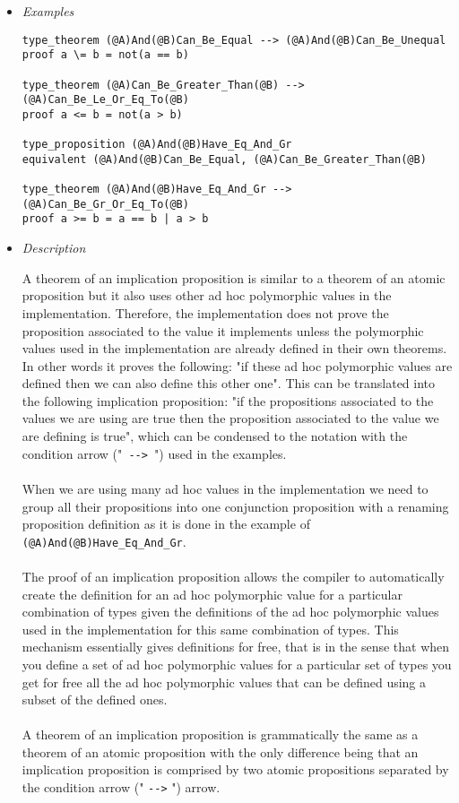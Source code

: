 \documentclass[diploma]{softlab-thesis}
\begin{document}
\begin{itemize}
\item \textit{Examples}

\begin{verbatim}
type_theorem (@A)And(@B)Can_Be_Equal --> (@A)And(@B)Can_Be_Unequal
proof a \= b = not(a == b)

type_theorem (@A)Can_Be_Greater_Than(@B) --> (@A)Can_Be_Le_Or_Eq_To(@B)
proof a <= b = not(a > b)

type_proposition (@A)And(@B)Have_Eq_And_Gr
equivalent (@A)And(@B)Can_Be_Equal, (@A)Can_Be_Greater_Than(@B)

type_theorem (@A)And(@B)Have_Eq_And_Gr --> (@A)Can_Be_Gr_Or_Eq_To(@B)
proof a >= b = a == b | a > b
\end{verbatim}

\item \textit{Description}

A theorem of an implication proposition is similar to a theorem of an atomic
proposition but it also uses other ad hoc polymorphic values in the
implementation. Therefore, the implementation does not prove the proposition
associated to the value it implements unless the polymorphic values used in the
implementation are already defined in their own theorems. In other words it
proves the following: "if these ad hoc polymorphic values are defined then we
can also define this other one". This can be translated into the following
implication proposition: "if the propositions associated to the values we are
using are true then the proposition associated to the value we are defining is
true", which can be condensed to the notation with the condition arrow
("\verb| --> |") used in the examples.
\\\\
When we are using many ad hoc values in the implementation we need to
group all their propositions into one conjunction proposition with
a renaming proposition definition as it is done in the example of \\
\verb|(@A)And(@B)Have_Eq_And_Gr|.
\\\\
The proof of an implication proposition allows the compiler to
automatically create the definition for an ad hoc polymorphic value for a
particular combination of types given the definitions of the ad hoc polymorphic
values used in the implementation for this same combination of types. This
mechanism essentially gives definitions for free, that is in the sense that
when you define a set of ad hoc polymorphic values for a particular set of
types you get for free all the ad hoc polymorphic values that can be defined
using a subset of the defined ones.
\\\\
A theorem of an implication proposition is grammatically the same as
a theorem of an atomic proposition with the only difference being that an
implication proposition is comprised by two atomic propositions separated by
the condition arrow (" \verb|-->| ") arrow.

\end{itemize}
\end{document}
